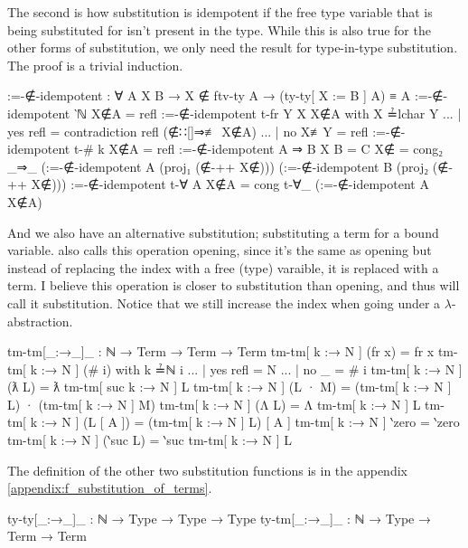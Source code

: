 \documentclass[logo,bsc,singlespacing,parskip,online]{infthesis}
\begin{document}
The second is how substitution is idempotent if the free type variable that is being substituted for
isn't present in the type. While this is also true for the other forms of substitution, we only need
the result for type-in-type substitution. The proof is a trivial induction.
\begin{code}
  :=-∉-idempotent : ∀ {A X B} → X ∉ ftv-ty A
    → (ty-ty[ X := B ] A) ≡ A
  :=-∉-idempotent {‵ℕ} X∉A = refl
  :=-∉-idempotent {t-fr Y} {X} X∉A with X ≟lchar Y
  ... | yes refl = contradiction refl (∉∷[]⇒≢ X∉A)
  ... | no  X≢Y  = refl
  :=-∉-idempotent {t-# k} X∉A = refl
  :=-∉-idempotent {A ⇒ B} {X} {B = C} X∉ = cong₂ _⇒_
    (:=-∉-idempotent {A} (proj₁ (∉-++ X∉)))
    (:=-∉-idempotent {B} (proj₂ (∉-++ X∉)))
  :=-∉-idempotent {t-∀ A} X∉A =
    cong t-∀_ (:=-∉-idempotent {A} X∉A)
\end{code}

And we also have an alternative substitution; substituting a term for a bound variable.
\citet{chargueraud_locally_2012} also calls this operation opening, since it's the same as opening
but instead of replacing the index with a free (type) varaible, it is replaced with a term. I
believe this operation is closer to substitution than opening, and thus will call it substitution.
Notice that we still increase the index when going under a $\lambda$-abstraction.
\begin{code}
  tm-tm[_:→_]_ : ℕ → Term → Term → Term
  tm-tm[ k :→ N ] (fr x) = fr x
  tm-tm[ k :→ N ] (# i) with k ≟ℕ i
  ... | yes refl = N
  ... | no  _    = # i
  tm-tm[ k :→ N ] (ƛ L) = ƛ tm-tm[ suc k :→ N ] L
  tm-tm[ k :→ N ] (L · M) = (tm-tm[ k :→ N ] L) · (tm-tm[ k :→ N ] M)
  tm-tm[ k :→ N ] (Λ L) = Λ tm-tm[ k :→ N ] L
  tm-tm[ k :→ N ] (L [ A ]) = (tm-tm[ k :→ N ] L) [ A ]
  tm-tm[ k :→ N ] ‵zero = ‵zero
  tm-tm[ k :→ N ] (‵suc L) = ‵suc tm-tm[ k :→ N ] L
\end{code}
The definition of the other two substitution functions is in the appendix \ref{appendix:f_substitution_of_terms}.
\begin{code}
  ty-ty[_:→_]_ : ℕ → Type → Type → Type
  ty-tm[_:→_]_ : ℕ → Type → Term → Term
\end{code}
\begin{comment}
\begin{code}
  ty-ty[ k :→ T ] ‵ℕ = ‵ℕ
  ty-ty[ k :→ T ] (t-fr x) = t-fr x
  ty-ty[ k :→ T ] (t-# i) with k ≟ℕ i
  ... | yes refl = T
  ... | no  _    = t-# i
  ty-ty[ k :→ T ] (A ⇒ B) = (ty-ty[ k :→ T ] A) ⇒ (ty-ty[ k :→ T ] B)
  ty-ty[ k :→ T ] (t-∀ A) = t-∀ (ty-ty[ (suc k) :→ T ] A)

  ty-tm[ k :→ T ] (fr x) = fr x
  ty-tm[ k :→ T ] (# i) = # i
  ty-tm[ k :→ T ] (ƛ L) = ƛ ty-tm[ k :→ T ] L
  ty-tm[ k :→ T ] (L · M) = (ty-tm[ k :→ T ] L) · (ty-tm[ k :→ T ] M)
  ty-tm[ k :→ T ] (Λ L) = Λ ty-tm[ suc k :→ T ] L
  ty-tm[ k :→ T ] (L [ A ]) = (ty-tm[ k :→ T ] L) [ ty-ty[ k :→ T ] A ]
  ty-tm[ k :→ T ] ‵zero = ‵zero
  ty-tm[ k :→ T ] (‵suc L) = ‵suc ty-tm[ k :→ T ] L
\end{code}
\end{comment}
\end{document}
